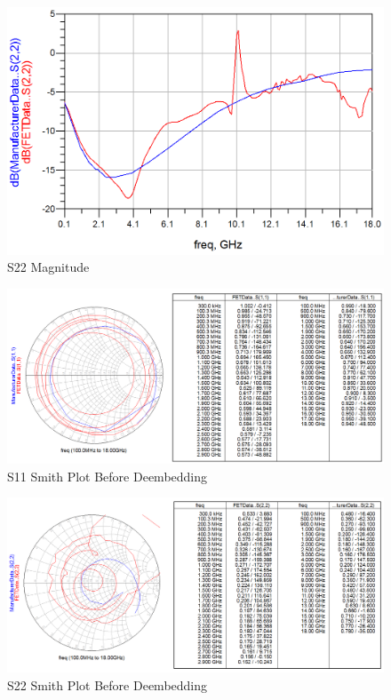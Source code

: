 \documentclass[conference]{IEEEtran}
\begin{document}
\begin{figure}[!h]
\centering
\includegraphics[scale=0.3]{pics/S22Magnitude.png}
\caption{S22 Magnitude}
\label{fig:s22mag}
\end{figure}

\begin{figure}[!h]
\centering
\includegraphics[scale=0.2]{pics/S11Smith.png}
\caption{S11 Smith Plot Before Deembedding}
\label{fig:s11smith}
\end{figure}

\begin{figure}[!h]
\centering
\includegraphics[scale=0.2]{pics/S22Smith.png}
\caption{S22 Smith Plot Before Deembedding}
\label{fig:s22smith}
\end{figure}
\end{document}

